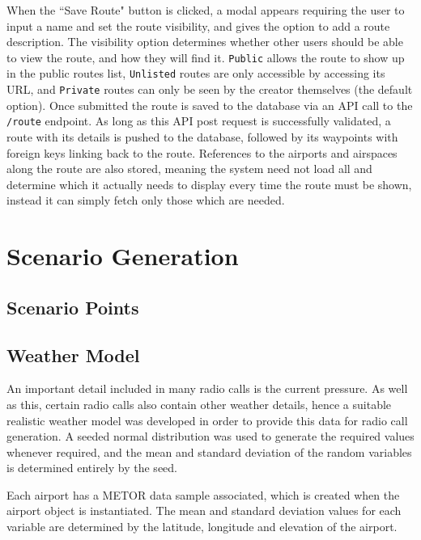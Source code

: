 When the ``Save Route" button is clicked, a modal appears requiring the user to input a name and set the route visibility, and gives the option to add a route description. The visibility option determines whether other users should be able to view the route, and how they will find it. \texttt{Public} allows the route to show up in the public routes list, \texttt{Unlisted} routes are only accessible by accessing its URL, and \texttt{Private} routes can only be seen by the creator themselves (the default option). Once submitted the route is saved to the database via an API call to the \texttt{/route} endpoint. As long as this API post request is successfully validated, a route with its details is pushed to the database, followed by its waypoints with foreign keys linking back to the route. References to the airports and airspaces along the route are also stored, meaning the system need not load all and determine which it actually needs to display every time the route must be shown, instead it can simply fetch only those which are needed.

\section{Scenario Generation}
\label{se:scenariogen}

\subsection{Scenario Points}
\label{sse:scenariopoints}

\subsection{Weather Model}
\label{sse:metormodel}
An important detail included in many radio calls is the current pressure. As well as this, certain radio calls also contain other weather details, hence a suitable realistic weather model was developed in order to provide this data for radio call generation. A seeded normal distribution was used to generate the required values whenever required, and the mean and standard deviation of the random variables is determined entirely by the seed.

Each airport has a METOR data sample associated, which is created when the airport object is instantiated. The mean and standard deviation values for each variable are determined by the latitude, longitude and elevation of the airport.

